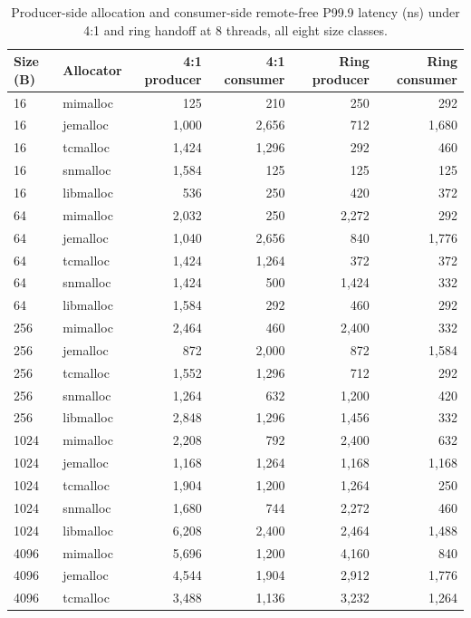 \begin{table}[!htbp]
\centering
\scriptsize
\setlength{\tabcolsep}{3pt}
\caption{Producer-side allocation and consumer-side remote-free P99.9 latency (ns) under 4:1 and ring handoff at 8 threads, all eight size classes.}
\label{tab:producer-consumer-4to1-ring}
\begin{tabular}{llrrrr}
\toprule
Size (B) & Allocator & 4:1 producer & 4:1 consumer & Ring producer & Ring consumer\\
\midrule
16 & mimalloc & 125 & 210 & 250 & 292 \\
16 & jemalloc & 1{,}000 & 2{,}656 & 712 & 1{,}680 \\
16 & tcmalloc & 1{,}424 & 1{,}296 & 292 & 460 \\
16 & snmalloc & 1{,}584 & 125 & 125 & 125 \\
16 & libmalloc & 536 & 250 & 420 & 372 \\
64 & mimalloc & 2{,}032 & 250 & 2{,}272 & 292 \\
64 & jemalloc & 1{,}040 & 2{,}656 & 840 & 1{,}776 \\
64 & tcmalloc & 1{,}424 & 1{,}264 & 372 & 372 \\
64 & snmalloc & 1{,}424 & 500 & 1{,}424 & 332 \\
64 & libmalloc & 1{,}584 & 292 & 460 & 292 \\
256 & mimalloc & 2{,}464 & 460 & 2{,}400 & 332 \\
256 & jemalloc & 872 & 2{,}000 & 872 & 1{,}584 \\
256 & tcmalloc & 1{,}552 & 1{,}296 & 712 & 292 \\
256 & snmalloc & 1{,}264 & 632 & 1{,}200 & 420 \\
256 & libmalloc & 2{,}848 & 1{,}296 & 1{,}456 & 332 \\
1024 & mimalloc & 2{,}208 & 792 & 2{,}400 & 632 \\
1024 & jemalloc & 1{,}168 & 1{,}264 & 1{,}168 & 1{,}168 \\
1024 & tcmalloc & 1{,}904 & 1{,}200 & 1{,}264 & 250 \\
1024 & snmalloc & 1{,}680 & 744 & 2{,}272 & 460 \\
1024 & libmalloc & 6{,}208 & 2{,}400 & 2{,}464 & 1{,}488 \\
4096 & mimalloc & 5{,}696 & 1{,}200 & 4{,}160 & 840 \\
4096 & jemalloc & 4{,}544 & 1{,}904 & 2{,}912 & 1{,}776 \\
4096 & tcmalloc & 3{,}488 & 1{,}136 & 3{,}232 & 1{,}264 \\

\end{tabular}
\end{table}
